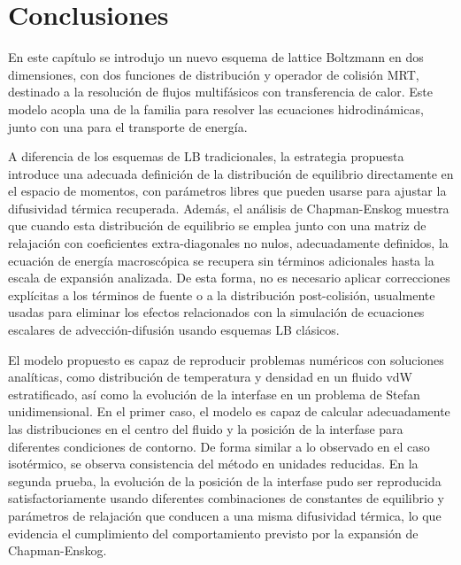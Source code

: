 \FloatBarrier




\section{Conclusiones}

En este cap\'itulo se introdujo un nuevo esquema de lattice Boltzmann en dos dimensiones, con dos funciones de distribuci\'on y operador de colisi\'on MRT, destinado a la resoluci\'on de flujos multif\'asicos con transferencia de calor. Este modelo acopla una \lbe{} de la familia \pp{} para resolver las ecuaciones hidrodin\'amicas, junto con una para el transporte de energ\'ia.

A diferencia de los esquemas de LB tradicionales, la estrategia propuesta introduce una adecuada definici\'on de la distribuci\'on de equilibrio directamente en el espacio de momentos, con par\'ametros libres que pueden usarse para ajustar la difusividad t\'ermica recuperada. Adem\'as, el an\'alisis de Chapman-Enskog muestra que cuando esta distribuci\'on de equilibrio se emplea junto con una matriz de relajaci\'on con coeficientes extra-diagonales no nulos, adecuadamente definidos, la ecuaci\'on de energ\'ia macrosc\'opica se recupera sin t\'erminos adicionales hasta la escala de expansi\'on analizada. De esta forma, no es necesario aplicar correcciones expl\'icitas a los t\'erminos de fuente o a la distribuci\'on post-colisi\'on, usualmente usadas para eliminar los efectos relacionados con la simulaci\'on de ecuaciones escalares de advecci\'on-difusi\'on usando esquemas LB cl\'asicos.

El modelo propuesto es capaz de reproducir problemas num\'ericos con soluciones anal\'iticas, como distribuci\'on de temperatura y densidad en un fluido vdW estratificado, as\'i como la evoluci\'on de la interfase en un problema de Stefan unidimensional. En el primer caso, el modelo es capaz de calcular adecuadamente las distribuciones en el centro del fluido y la posici\'on de la interfase para diferentes condiciones de contorno. De forma similar a lo observado en el caso isot\'ermico, se observa consistencia del m\'etodo en unidades reducidas. En la segunda prueba, la evoluci\'on de la posici\'on de la interfase pudo ser reproducida satisfactoriamente usando diferentes combinaciones de constantes de equilibrio y par\'ametros de relajaci\'on que conducen a una misma difusividad t\'ermica, lo que evidencia el cumplimiento del comportamiento previsto por la expansi\'on de Chapman-Enskog.

